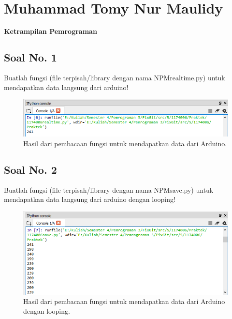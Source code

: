 \section{Muhammad Tomy Nur Maulidy}
{\Large \textbf{Ketrampilan Pemrograman}}
\subsection{Soal No. 1}
Buatlah  fungsi  (file  terpisah/library  dengan  nama  NPMrealtime.py)  untuk mendapatkan data langsung dari arduino!


\begin{figure}[H]
	\includegraphics[width=12cm]{figures/5/1174031/Praktek/1.png}
	\centering
	\caption{Hasil dari pembacaan fungsi untuk mendapatkan data dari Arduino.}
\end{figure}

\subsection{Soal No. 2}
Buatlah fungsi (file terpisah/library dengan nama NPMsave.py) untuk mendapatkan data langsung dari arduino dengan looping!


\begin{figure}[H]
	\includegraphics[width=12cm]{figures/5/1174031/Praktek/2.png}
	\centering
	\caption{Hasil dari pembacaan fungsi untuk mendapatkan data dari Arduino dengan looping.}
\end{figure}


